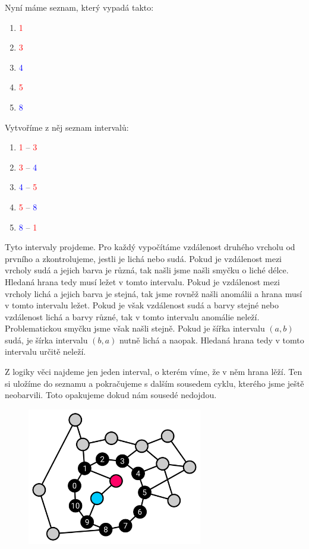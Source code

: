 \documentclass{article}
\begin{document}
Nyní máme seznam, který vypadá takto:

\begin{enumerate}
    \item \textcolor{red}{1}
    \item \textcolor{red}{3}
    \item \textcolor{blue}{4}
    \item \textcolor{red}{5}
    \item \textcolor{blue}{8}
\end{enumerate}

Vytvoříme z něj seznam intervalů:

\begin{enumerate}
    \item \textcolor{red}{1} -- \textcolor{red}{3}
    \item \textcolor{red}{3} -- \textcolor{blue}{4}
    \item \textcolor{blue}{4} -- \textcolor{red}{5}
    \item \textcolor{red}{5} -- \textcolor{blue}{8}
    \item \textcolor{blue}{8} -- \textcolor{red}{1}
\end{enumerate}

Tyto intervaly projdeme. Pro každý vypočítáme vzdálenost druhého vrcholu od prvního a zkontrolujeme, jestli je lichá nebo sudá. Pokud je vzdálenost mezi vrcholy sudá a jejich barva je různá, tak našli jsme našli smyčku o liché délce. Hledaná hrana tedy musí ležet v tomto intervalu. Pokud je vzdálenost mezi vrcholy lichá a jejich barva je stejná, tak jsme rovněž našli anomálii a hrana musí v tomto intervalu ležet. Pokud je však vzdálenost sudá a barvy stejné nebo vzdálenost lichá a barvy různé, tak v tomto intervalu anomálie neleží. Problematickou smyčku jsme však našli stejně. Pokud je šířka intervalu \((a,b)\) sudá, je šírka intervalu \((b,a)\) nutně lichá a naopak. Hledaná hrana tedy v tomto intervalu určitě neleží.

Z logiky věci najdeme jen jeden interval, o kterém víme, že v něm hrana lěží. Ten si uložíme do seznamu a pokračujeme s dalším sousedem cyklu, kterého jsme ještě neobarvili. Toto opakujeme dokud nám sousedé nedojdou.

\begin{figure}[H]
    \centering
    \includegraphics[height=6cm]{cycle/second.pdf}
\end{figure}
\end{document}
